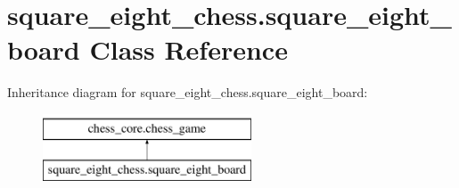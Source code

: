 \hypertarget{classsquare__eight__chess_1_1square__eight__board}{}\section{square\+\_\+eight\+\_\+chess.\+square\+\_\+eight\+\_\+board Class Reference}
\label{classsquare__eight__chess_1_1square__eight__board}
Inheritance diagram for square\+\_\+eight\+\_\+chess.\+square\+\_\+eight\+\_\+board\+:\begin{figure}[H]
\begin{center}
\leavevmode
\includegraphics[height=2.000000cm]{classsquare__eight__chess_1_1square__eight__board}
\end{center}
\end{figure}
